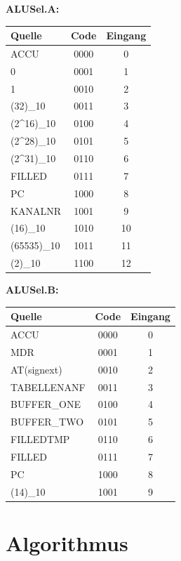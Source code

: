 \textbf{ALUSel.A:}

\begin{tabular}{lcc}
    Quelle               & Code & Eingang \\
    \hline
    ACCU                 & 0000 &  0 \\
    0                    & 0001 &  1 \\
    1                    & 0010 &  2 \\
    (32)_{10}            & 0011 &  3 \\
    (2^{16})_{10}        & 0100 &  4 \\
    (2^{28})_{10}        & 0101 &  5 \\
    (2^{31})_{10}        & 0110 &  6 \\
    FILLED               & 0111 &  7 \\
    PC                   & 1000 &  8 \\
    KANALNR              & 1001 &  9 \\
    (16)_{10}            & 1010 & 10 \\
    (65535)_{10}         & 1011 & 11 \\
    (2)_{10}             & 1100 & 12 \\
\end{tabular}

\textbf{ALUSel.B:}

\begin{tabular}{lcc}
    Quelle        & Code & Eingang \\
    \hline
    ACCU          & 0000 &  0 \\
    MDR           & 0001 &  1 \\
    AT(signext)   & 0010 &  2 \\
    TABELLENANF   & 0011 &  3 \\
    BUFFER\_ONE   & 0100 &  4 \\
    BUFFER\_TWO   & 0101 &  5 \\
    FILLEDTMP     & 0110 &  6 \\
    FILLED        & 0111 &  7 \\
    PC            & 1000 &  8 \\
    (14)_{10}     & 1001 &  9 \\
\end{tabular}

\section{Algorithmus}
\label{section:Dokumentation-Implementierung-Algorithmus}

